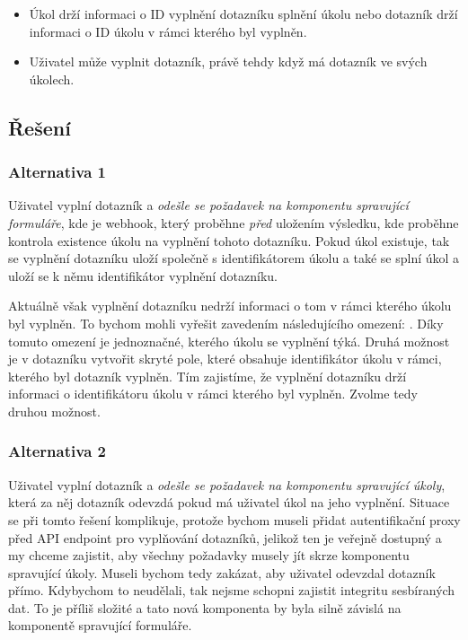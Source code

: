\begin{itemize}
    \item
    Úkol drží informaci o ID vyplnění dotazníku splnění úkolu nebo dotazník drží informaci o ID úkolu v rámci kterého byl vyplněn.
    \item
    Uživatel může vyplnit dotazník, právě tehdy když má dotazník ve svých úkolech.
\end{itemize}

\subsection{Řešení}\label{subsec:reseni}

\subsubsection{Alternativa 1}\label{subsubsec:alternativa-1}

Uživatel vyplní dotazník a \emph{odešle se požadavek na komponentu spravující formuláře}, kde je webhook, který proběhne \emph{před} uložením výsledku, kde proběhne kontrola existence úkolu na vyplnění tohoto dotazníku.
Pokud úkol existuje, tak se vyplnění dotazníku uloží společně s identifikátorem úkolu a také se splní úkol a uloží se k němu identifikátor vyplnění dotazníku.

Aktuálně však vyplnění dotazníku nedrží informaci o tom v rámci kterého úkolu byl vyplněn.
To bychom mohli vyřešit zavedením následujícího omezení: .
Díky tomuto omezení je jednoznačné, kterého úkolu se vyplnění týká.
Druhá možnost je v dotazníku vytvořit skryté pole, které obsahuje identifikátor úkolu v rámci, kterého byl dotazník vyplněn.
Tím zajistíme, že vyplnění dotazníku drží informaci o identifikátoru úkolu v rámci kterého byl vyplněn.
Zvolme tedy druhou možnost.

\subsubsection{Alternativa 2}\label{subsubsec:alternativa-2}

Uživatel vyplní dotazník a \emph{odešle se požadavek na komponentu spravující úkoly}, která za něj dotazník odevzdá pokud má uživatel úkol na jeho vyplnění.
Situace se při tomto řešení komplikuje, protože bychom museli přidat autentifikační proxy před API endpoint pro vyplňování dotazníků, jelikož ten je veřejně dostupný a my chceme zajistit, aby všechny požadavky musely jít skrze komponentu spravující úkoly.
Museli bychom tedy zakázat, aby uživatel odevzdal dotazník přímo.
Kdybychom to neudělali, tak nejsme schopni zajistit integritu sesbíraných dat.
To je příliš složité a tato nová komponenta by byla silně závislá na komponentě spravující formuláře.

